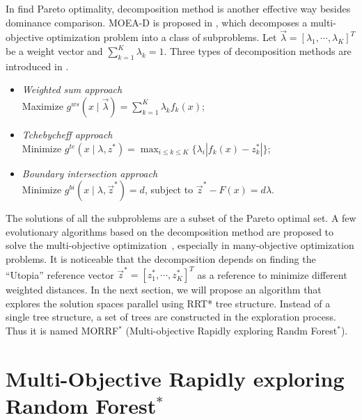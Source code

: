 \documentclass[conference]{IEEEtran}
\begin{document}
In find Pareto optimality, decomposition method is another effective way besides dominance comparison.
MOEA-D is proposed in \cite{4358754}, which decomposes a multi-objective optimization problem into a class of subproblems.
Let $ \vec{\lambda} = [ \lambda_{1} , \cdots , \lambda_{K}  ]^{T} $ be a weight vector and $ \sum_{k=1}^{K} \lambda_{k} = 1 $.
Three types of decomposition methods are introduced in \cite{4358754}.
\begin{itemize}
\item \emph{Weighted sum approach} \\
Maximize $ g^{ws} (x \mid \vec{\lambda}) = \sum_{k=1}^{K} \lambda_{k} f_{k} (x) $;
\item \emph{Tchebycheff approach} \\
Minimize $ g^{te} (x \mid \lambda , z^{*}) = \max_{i \leq k \leq K}  \{ \lambda_{i} | f_{k}(x) - z^{*}_{k}  | \} $;
\item \emph{Boundary intersection approach} \\
Minimize $ g^{bi} (x \mid \lambda , \vec{z}^{*} ) = d $, subject to $ \vec{z}^{*} - F(x) = d \lambda $.
\end{itemize}
The solutions of all the subproblems are a subset of the Pareto optimal set.
A few evolutionary algorithms based on the decomposition method are proposed to solve the multi-objective optimization~\cite{6600851}, 
especially in many-objective optimization problems.
It is noticeable that the decomposition depends on finding the ``Utopia'' reference vector $ \vec{z}^{*} = [z^{*}_{1}, \cdots , z^{*}_{K}]^{T} $ as a reference to minimize different weighted distances.
In the next section, we will propose an algorithm that explores the solution spaces parallel using RRT* tree structure.
Instead of a single tree structure, a set of trees are constructed in the exploration process.
Thus it is named MORRF$^{*}$ (Multi-objective Rapidly exploring Randm Forest$^{*}$).



\section{Multi-Objective Rapidly exploring Random Forest$^{*}$}
\label{sec:morrt}
\end{document}

